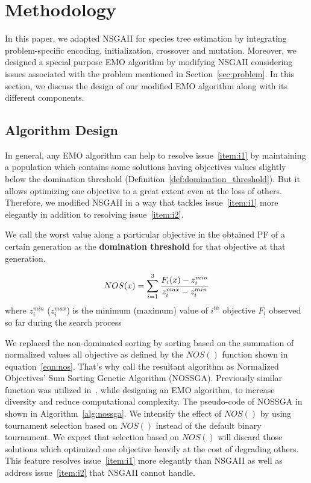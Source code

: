 \section{Methodology}
\label{sec:method}
In this paper, we adapted NSGAII for species tree estimation by integrating problem-specific encoding, initialization, crossover and mutation. Moreover, we designed a special purpose EMO algorithm by modifying NSGAII considering issues associated with the problem mentioned in Section~\ref{sec:problem}. In this section, we discuss the design of our modified EMO algorithm along with its different components.


\subsection{Algorithm Design}
In general, any EMO algorithm can help to resolve issue~\ref{item:i1} by maintaining a population which contains some solutions having objectives values slightly below the domination threshold (Definition~\ref{def:domination_threshold}). But it allows optimizing one objective to a great extent even at the loss of others. Therefore, we modified NSGAII in a way that tackles issue~\ref{item:i1} more elegantly in addition to resolving issue~\ref{item:i2}.  

\begin{definition}\label{def:domination_threshold}
	\small
	We call the worst value along a particular objective in the obtained PF of a certain generation as the \textbf{domination threshold} for that objective at that generation.
\end{definition}

\begin{equation}\label{eqn:nos}
\small
NOS(x) = \sum_{i=1}^{3} \frac{F_i(x)-z_i^{min}}{z_i^{max}-z_i^{min}}
\end{equation}
{\scriptsize where $z_i^{min}$ ($z_i^{max}$) is the minimum (maximum) value of $i^{th}$ objective $F_i$ observed so far during the search process}

We replaced the non-dominated sorting by sorting based on the summation of normalized values all objective as defined by the $NOS()$ function shown in equation~\ref{eqn:nos}. That's why call the resultant algorithm as Normalized Objectives' Sum Sorting Genetic Algorithm (NOSSGA). Previously similar function was utilized in~\cite{qu2010multi}, while designing an EMO algorithm, to increase diversity and reduce computational complexity. The pseudo-code of NOSSGA in shown in Algorithm~\ref{alg:nossga}. We intensify the effect of $NOS()$ by using tournament selection based on $NOS()$ instead of the default binary tournament. We expect that selection based on $NOS()$ will discard those solutions which optimized one objective heavily at the cost of degrading others. This feature resolves issue~\ref{item:i1} more elegantly than NSGAII as well as address issue~\ref{item:i2} that NSGAII cannot handle. 

